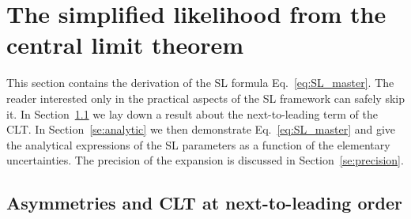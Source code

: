 \documentclass[11pt]{article}
\begin{document}
\section{The simplified likelihood from the central limit theorem}
\label{se:SL_theory}

This section contains the derivation of the SL formula Eq.~\eqref{eq:SL_master}.
The reader interested only in the practical aspects of the SL framework can safely skip it. In Section~\ref{se:skew_CLT} we lay down a  result about the next-to-leading term of the CLT. In Section~\ref{se:analytic} we then demonstrate Eq.~\eqref{eq:SL_master} and give the analytical expressions of the SL parameters as a function of the elementary uncertainties. The precision of the expansion is discussed in Section~\ref{se:precision}. 

\subsection{Asymmetries and CLT at next-to-leading order}
\label{se:skew_CLT}


\end{document}
